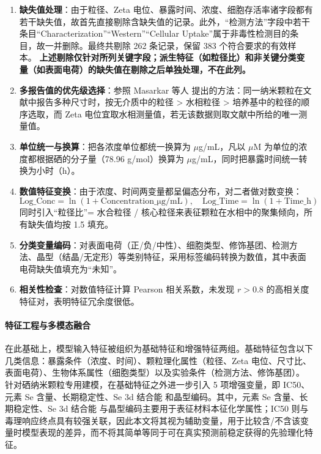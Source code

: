 \documentclass[letterpaper]{article}
\begin{document}
\begin{enumerate}
  \item \textbf{缺失值处理}：由于粒径、Zeta 电位、暴露时间、浓度、细胞存活率诸字段都有若干缺失值，故首先直接剔除含缺失值的记录。此外，“检测方法”字段中若干条目“Characterization”“Western”“Cellular Uptake”属于非毒性检测目的条目，故一并删除。最终共剔除 262 条记录，保留 383 个符合要求的有效样本。
  \textbf{上述剔除仅针对所列关键字段；派生特征（如粒径比）和非关键分类变量（如表面电荷）的缺失值在剔除之后单独处理，不在此列。}

  \item \textbf{多报告值的优先级选择}：参照 Masarkar 等人 \cite{masarkar2024} 提出的方法：同一纳米颗粒在文献中报告多种尺寸时，按无介质中的粒径 > 水相粒径 > 培养基中的粒径的顺序选取，而 Zeta 电位宜取水相测量值，若无该数据则取文献中所给的唯一测量值。

  \item \textbf{单位统一与换算}：把各浓度单位都统一换算为 $\mu$g/mL，凡以 $\mu$M 为单位的浓度都根据硒的分子量（78.96 g/mol）换算为 $\mu$g/mL，同时把暴露时间统一转换为小时（h）。

  \item \textbf{数值特征变换}：由于浓度、时间两变量都呈偏态分布，对二者做对数变换：
        \[
          \text{Log\_Conc} = \ln(1 + \text{Concentration\_μg/mL}), \quad
          \text{Log\_Time} = \ln(1 + \text{Time\_h})
        \]
        同时引入“粒径比”= 水合粒径 / 核心粒径来表征颗粒在水相中的聚集倾向，所有缺失值均按 1.5 填充。

  \item \textbf{分类变量编码}：对表面电荷（正/负/中性）、细胞类型、修饰基团、检测方法、晶型（结晶/无定形）等类别特征，采用标签编码转换为数值，其中表面电荷缺失值填充为“未知”。

  \item \textbf{相关性检查}：对数值特征计算 Pearson 相关系数，未发现 $r > 0.8$ 的高相关度特征对，表明特征冗余度很低。
\end{enumerate}

\paragraph{特征工程与多模态融合}

在此基础上，模型输入特征被组织为基础特征和增强特征两组。基础特征包含以下几类信息：暴露条件（浓度、时间）、颗粒理化属性（粒径、Zeta 电位、尺寸比、表面电荷）、生物体系属性（细胞类型）以及实验条件（检测方法、修饰基团）。
针对硒纳米颗粒专用建模，在基础特征之外进一步引入 5 项增强变量，即 IC50、元素 Se 含量、长期稳定性、Se 3d 结合能 和晶型编码。其中，元素 Se 含量、长期稳定性、Se 3d 结合能 与晶型编码主要用于表征材料本征化学属性；IC50 则与毒理响应终点具有较强关联，因此本文将其视为辅助变量，用于比较含/不含该变量时模型表现的差异，而不将其简单等同于可在真实预测前稳定获得的先验理化特征。
\end{document}
